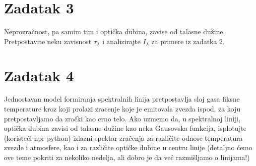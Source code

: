\documentclass[12pt]{article}
\begin{document}
\section{Zadatak 3}
Neprozra\v{c}nost, pa samim tim i opti\v{c}ka dubina, zavise od talasne du\v{z}ine. Pretpostavite neku zavisnost $\tau_\lambda$ i analizirajte $I_\lambda$ za primere iz zadatka 2.

\section{Zadatak 4}
Jednostavan model formiranja spektralnih linija pretpostavlja sloj gasa fiksne temperature kroz koji prolazi zracenje koje je emitovala zvezda ispod, za koju pretpostavljamo da zra\v{c}ki kao crno telo. Ako uzmemo da, u spektralnoj liniji, opti\v{c}ka dubina zavisi od talasne du\v{z}ine kao neka Gausovska funkcija, isplotujte (koriste\'{c}i npr python) izlazni spektar zra\v{c}enja za razli\v{c}ite odnose temperatura zvezde i atmosfere, kao i za razli\v{c}ite opti\v{c}ke dubine u centru linije (detaljno \'{c}emo ove teme pokriti za nekoliko nedelja, ali dobro je da ve\'{c} razmi\v{s}ljamo o linijama!)
\end{document}
